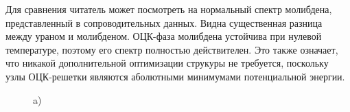 \documentclass[master,14pt,subf,href,colorlinks=true
]{disser}
\begin{document}
Для сравнения читатель может посмотреть на нормальный спектр молибдена, представленный в сопроводительных данных. Видна существенная разница между ураном и молибденом. ОЦК-фаза молибдена устойчива при нулевой температуре, поэтому его спектр полностью действителен. Это также означает, что никакой дополнительной оптимизации струкуры не требуется, поскольку узлы ОЦК-решетки являются аболютными минимумами потенциальной энергии.
\begin{figure}[h]		%
\begin{center}
\begin{minipage}[h]{.7\linewidth}
 a) \\
\end{minipage}
\vfill

\end{center}
\end{figure}
\end{document}

